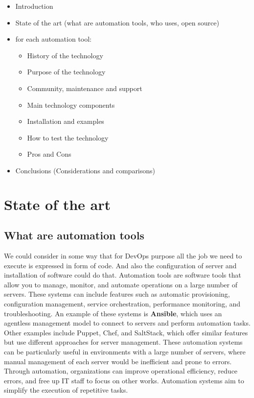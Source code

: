 \documentclass[12pt,a4paper,openright,twoside]{book}
\begin{document}
\begin{itemize}
    \item Introduction
    \item State of the art (what are automation tools, who uses, open source)
    \item for each automation tool:
    \begin{itemize}
    \item History of the technology
    \item Purpose of the technology
    \item Community, maintenance and support
    \item Main technology components
    \item Installation and examples
    \item How to test the technology
    \item Pros and Cons
    \end{itemize}
    \item Conclusions (Considerations and comparisons)
\end{itemize}



\chapter{State of the art}

\section{What are automation tools}
We could consider in some way that for DevOps purpose all the job we need to execute is expressed in form of code\cite{learnDevOps}.
And also the configuration of server and installation of software could do that.
Automation tools are software tools that allow you to manage, monitor, and automate operations on a large number of servers. These systems can include features such as automatic provisioning, configuration management, service orchestration, performance monitoring, and troubleshooting.
An example of these systems is \textbf{Ansible}, which uses an agentless management model to connect to servers and perform automation tasks. Other examples include Puppet, Chef, and SaltStack, which offer similar features but use different approaches for server management.
These automation systems can be particularly useful in environments with a large number of servers, where manual management of each server would be inefficient and prone to errors. Through automation, organizations can improve operational efficiency, reduce errors, and free up IT staff to focus on other works.
Automation systems aim to simplify the execution of repetitive tasks.
\end{document}
